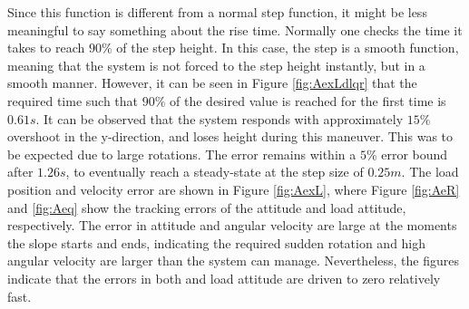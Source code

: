 Since this function is different from a normal step function, it might be less meaningful to say something about the rise time. 
Normally one checks the time it takes to reach $ 90\% $ of the step height. 
In this case, the step is a smooth function, meaning that the system is not forced to the step height instantly, but in a smooth manner. 
However, it can be seen in Figure \ref{fig:AexLdlqr} that the required time such that $ 90 \% $ of the desired value is reached for the first time is $ 0.61 s $.
It can be observed that the system responds with approximately $ 15 \% $ overshoot in the y-direction, and loses height during this maneuver.
This was to be expected due to large  rotations. The error remains within a $ 5 \% $ error bound after $ 1.26 s $, 
to eventually reach a steady-state at the step size of $ 0.25 m $. 
The load position and velocity error are shown in Figure \ref{fig:AexL}, where Figure \ref{fig:AeR} and \ref{fig:Aeq} show the tracking errors of the  attitude and load attitude, respectively. 
The error in  attitude and angular velocity are large at the moments the slope starts and ends, indicating the required sudden  rotation and high angular velocity are larger than the system can manage.
Nevertheless, the figures indicate that the errors in both  and load attitude are driven to zero relatively fast.

